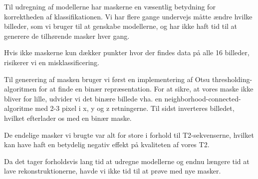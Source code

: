 Til udregning af modellerne har maskerne en væsentlig betydning for korrektheden af klassifikationen. Vi har flere gange undervejs måtte ændre hvilke billeder, som vi bruger til at genskabe modellerne, og har ikke haft tid til at generere de tilhørende masker hver gang.

Hvis ikke maskerne kun dækker punkter hvor der findes data på alle 16 billeder, risikerer vi en misklassificering. 

Til generering af masken bruger vi først en implementering af Otsu
thresholding-algoritmen for at finde en binær repræsentation. For at
sikre, at vores maske ikke bliver for lille, udvider vi det binære billede
vha. en neighborhood-connected-algoritme med 2-3 pixel i x, y og z
retningerne. Til sidst inverteres billedet, hvilket efterlader os med en
binær maske.

De endelige masker vi brugte var alt for store i forhold til T2-sekvenserne, hvilket kan have haft en betydelig negativ effekt på kvaliteten af vores T2.

Da det tager forholdsvis lang tid at udregne modellerne og endnu længere tid at lave rekonstruktionerne, havde vi ikke tid til at prøve med nye masker.

